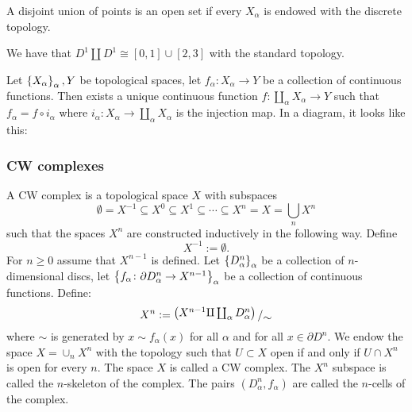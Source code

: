 \documentclass[11pt,a4paper]{article}
\begin{document}
\begin{example}
  A disjoint union of points is an open set if every $X_{\alpha}$ is endowed
  with the discrete topology.
\end{example}

\begin{example}
  We have that $D^1 \coprod D^1 \cong [0,1] \cup [2,3]$ with the standard
  topology.
\end{example}

\begin{proposition}
  Let $\set{X_{\alpha}}_{\alpha}, Y$ be topological spaces,
  let $f_{\alpha} \colon X_{\alpha} \to Y$ be a collection of continuous
  functions.
  Then exists a unique continuous function 
  $f \colon \coprod_{\alpha} X_{\alpha} \to Y$ such that
  $f_{\alpha} = f \circ i_{\alpha}$ where $i_{\alpha} \colon X_{\alpha} \to
  \coprod_{\alpha} X_{\alpha}$ is the injection map.
  In a diagram, it looks like this:
  \begin{center}
  \end{center}
\end{proposition}

\subsubsection{CW complexes}

\begin{definition}[CW complex]
  A CW complex is a topological space $X$ with subspaces
  \[
    \emptyset= X^{-1} \subseteq X^{0} \subseteq X^{1} \subseteq \cdots
    \subseteq X^n = X = \bigcup_{n} X^{n}
  \]
  such that the spaces $X^n$ are constructed inductively in the following
  way. Define
  \[
    X^{-1} := \emptyset.
  \]
  For $n \geq 0$ assume that $X^{n-1}$ is defined.
  Let $\set{D^n_{\alpha}}_{\alpha}$ be a collection of $n$-dimensional discs,
  let $\set{f_{\alpha} \colon \partial D^n_{\alpha} \to X^{n-1}}_{\alpha}$
  be a collection of continuous functions. Define:
  \[
    X^{n} := 
    \bigslant{\del{
    X^{n-1} \rotatebox[origin=c]{180}{$\Pi$} \coprod_{\alpha} D^n_{\alpha}
    }}
    {\sim}
  \]
  where $\sim$ is generated by $x \sim f_{\alpha}(x)$ for all $\alpha$ and
  for all $x \in \partial D^n$.
  We endow the space $X = \cup_{n} X^n$ with the topology such that 
  $U \subset X$ open if and only if $U \cap X^n$ is open for every $n$.
  The space $X$ is called a CW complex. The $X^n$ subspace is called the
  $n$-skeleton of the complex.
  The pairs $(D^n_{\alpha}, f_{\alpha})$ are called the $n$-cells of
  the complex.
\end{definition}
\end{document}
